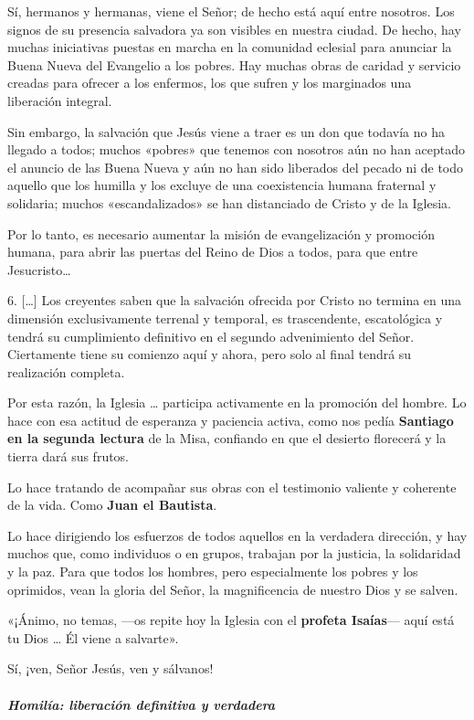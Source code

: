 \documentclass[]{article}
\let\oldsubparagraph\subparagraph
\renewcommand{\subparagraph}[1]{\oldsubparagraph{#1}\mbox{}}
\begin{document}
Sí, hermanos y hermanas, viene el Señor; de hecho está aquí entre
nosotros. Los signos de su presencia salvadora ya son visibles en
nuestra ciudad. De hecho, hay muchas iniciativas puestas en marcha en la
comunidad eclesial para anunciar la Buena Nueva del Evangelio a los
pobres. Hay muchas obras de caridad y servicio creadas para ofrecer a
los enfermos, los que sufren y los marginados una liberación integral.

Sin embargo, la salvación que Jesús viene a traer es un don que todavía
no ha llegado a todos; muchos «pobres» que tenemos con nosotros aún no
han aceptado el anuncio de las Buena Nueva y aún no han sido liberados
del pecado ni de todo aquello que los humilla y los excluye de una
coexistencia humana fraternal y solidaria; muchos «escandalizados» se
han distanciado de Cristo y de la Iglesia.

Por lo tanto, es necesario aumentar la misión de evangelización y
promoción humana, para abrir las puertas del Reino de Dios a todos, para
que entre Jesucristo\ldots{}

6. {[}\ldots{}{]} Los creyentes saben que la salvación ofrecida por
Cristo no termina en una dimensión exclusivamente terrenal y temporal,
es trascendente, escatológica y tendrá su cumplimiento definitivo en el
segundo advenimiento del Señor. Ciertamente tiene su comienzo aquí y
ahora, pero solo al final tendrá su realización completa.

Por esta razón, la Iglesia \ldots{} participa activamente en la
promoción del hombre. Lo hace con esa actitud de esperanza y paciencia
activa, como nos pedía \textbf{Santiago en la segunda lectura} de la
Misa, confiando en que el desierto florecerá y la tierra dará sus
frutos.

Lo hace tratando de acompañar sus obras con el testimonio valiente y
coherente de la vida. Como \textbf{Juan el Bautista}.

Lo hace dirigiendo los esfuerzos de todos aquellos en la verdadera
dirección, y hay muchos que, como individuos o en grupos, trabajan por
la justicia, la solidaridad y la paz. Para que todos los hombres, pero
especialmente los pobres y los oprimidos, vean la gloria del Señor, la
magnificencia de nuestro Dios y se salven.

«¡Ánimo, no temas, ---os repite hoy la Iglesia con el \textbf{profeta
Isaías}--- aquí está tu Dios \ldots{} Él viene a salvarte».

Sí, ¡ven, Señor Jesús, ven y sálvanos!

\subparagraph{Homilía: liberación definitiva y
verdadera}\label{homiluxeda-liberaciuxf3n-definitiva-y-verdadera}
\end{document}
